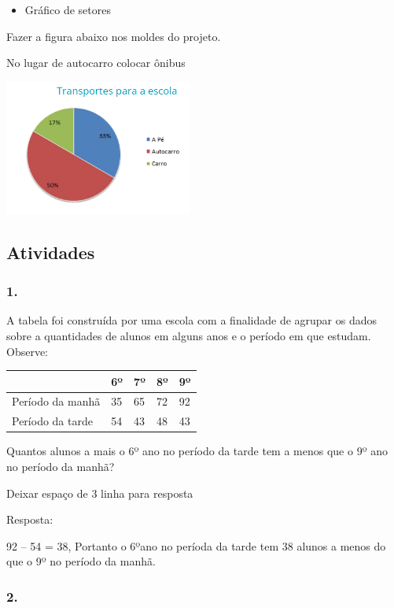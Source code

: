 \begin{itemize}
\item
  Gráfico de setores
\end{itemize}

Fazer a figura abaixo nos moldes do projeto.

No lugar de autocarro colocar ônibus

\includegraphics[width=2.42308in,height=1.74971in]{media/image94.png}

\subsection{Atividades}\label{atividades-7}

\subsubsection{1.}\label{section-91}

A tabela foi construída por uma escola com a finalidade de agrupar os
dados sobre a quantidades de alunos em alguns anos e o período em que
estudam. Observe:

\begin{longtable}[]{@{}lllll@{}}
\toprule
& 6º & 7º & 8º & 9º\tabularnewline
\midrule
\endhead
Período da manhã & 35 & 65 & 72 & 92\tabularnewline
Período da tarde & 54 & 43 & 48 & 43\tabularnewline
\bottomrule
\end{longtable}

Quantos alunos a mais o 6º ano no período da tarde tem a menos que o 9º
ano no período da manhã?

Deixar espaço de 3 linha para resposta

Resposta:

92 -- 54 = 38, Portanto o 6ºano no períoda da tarde tem 38 alunos a
menos do que o 9º no período da manhã.

\subsubsection{2.}\label{section-92}

